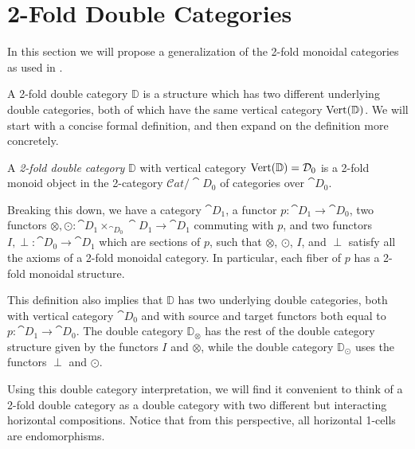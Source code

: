 
\chapter{2-Fold Double Categories}

In this section we will propose a generalization of the 2-fold monoidal categories as used in \cite{garner:soa}.

A 2-fold double category $\mathbb{D}$ is a structure which has two different underlying double categories, both of which have the same vertical category $\operatorname{Vert}(\mathbb{D})$. We will start with a concise formal definition, and then expand on the definition more concretely.

\begin{definition}
	A \emph{2-fold double category} $\mathbb{D}$ with vertical category $\operatorname{Vert}(\mathbb{D})=\mathcal{D}_0$ is a 2-fold monoid object in the 2-category $\mathcal{C}at/\cat{D}_0$ of categories over $\cat{D}_0$.
\end{definition}

Breaking this down, we have a category $\cat{D}_1$, a functor $p\colon\cat{D}_1\to\cat{D}_0$, two functors $\otimes, \odot\colon \cat{D}_1\times_{\cat{D}_0}\cat{D}_1\to\cat{D}_1$ commuting with $p$, and two functors $I,\perp\colon\cat{D}_0\to\cat{D}_1$ which are sections of $p$, such that $\otimes$, $\odot$, $I$, and $\perp$ satisfy all the axioms of a 2-fold monoidal category. In particular, each fiber of $p$ has a 2-fold monoidal structure.

This definition also implies that $\mathbb{D}$ has two underlying double categories, both with vertical category $\cat{D}_0$ and with source and target functors both equal to $p\colon\cat{D}_1\to\cat{D}_0$. The double category $\mathbb{D}_{\otimes}$ has the rest of the double category structure given by the functors $I$ and $\otimes$, while the double category $\mathbb{D}_{\odot}$ uses the functors $\perp$ and $\odot$.

Using this double category interpretation, we will find it convenient to think of a 2-fold double category as a double category with two different but interacting horizontal compositions. Notice that from this perspective, all horizontal 1-cells are endomorphisms.

